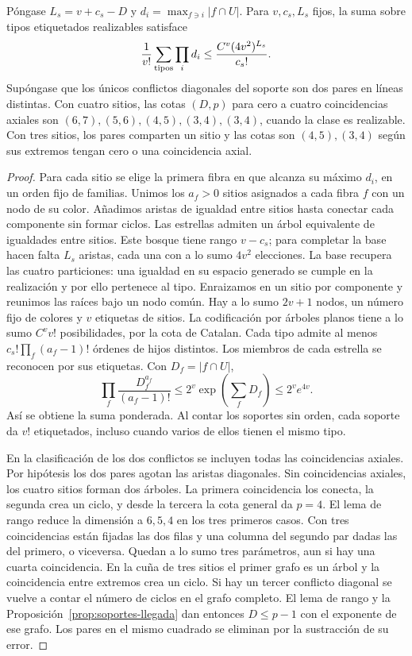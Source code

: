 \begin{lema}\label{lem:tipos-llegada}
Póngase \(L_s=v+c_s-D\) y \(d_i=\max_{f\ni i}|f\cap U|\). Para \(v,c_s,L_s\) fijos,
la suma sobre tipos etiquetados realizables satisface
\[
 \frac1{v!}\sum_{\rm tipos}\prod_i d_i\le \frac{C^v(4v^2)^{L_s}}{c_s!}.
\]
Supóngase que los únicos conflictos diagonales del soporte son dos pares en líneas distintas.
Con cuatro sitios, las cotas \((D,p)\) para cero a cuatro coincidencias axiales son
\((6,7),(5,6),(4,5),(3,4),(3,4)\), cuando la clase es realizable.
Con tres sitios, los pares comparten un sitio y las cotas son \((4,5),(3,4)\)
según sus extremos tengan cero o una coincidencia axial.
\end{lema}
\begin{proof}
Para cada sitio se elige la primera fibra en que alcanza su máximo \(d_i\), en un orden
fijo de familias. Unimos los \(a_f>0\) sitios asignados a cada fibra \(f\) con un nodo de
su color. Añadimos aristas de igualdad entre sitios hasta conectar cada componente sin
formar ciclos. Las estrellas admiten un árbol equivalente de igualdades entre sitios.
Este bosque tiene rango \(v-c_s\); para completar la base hacen falta \(L_s\) aristas,
cada una con a lo sumo \(4v^2\) elecciones. La base recupera las cuatro particiones:
una igualdad en su espacio generado se cumple en la realización y por ello pertenece al
tipo. Enraizamos en un sitio por componente y reunimos las raíces bajo un nodo común.
Hay a lo sumo \(2v+1\) nodos, un número fijo de colores y \(v\) etiquetas de sitios.
La codificación por árboles planos tiene a lo sumo \(C^v v!\) posibilidades, por la cota
de Catalan. Cada tipo admite al menos \(c_s!\prod_f(a_f-1)!\) órdenes de hijos distintos.
Los miembros de cada estrella se reconocen por sus etiquetas. Con \(D_f=|f\cap U|\),
\[
 \prod_f\frac{D_f^{a_f}}{(a_f-1)!}\le 2^v\exp\!\left(\sum_fD_f\right)
 \le 2^ve^{4v}.
\]
Así se obtiene la suma ponderada. Al contar los soportes sin orden, cada soporte da \(v!\)
etiquetados, incluso cuando varios de ellos tienen el mismo tipo.

En la clasificación de los dos conflictos se incluyen todas las coincidencias axiales.
Por hipótesis los dos pares agotan las aristas diagonales. Sin coincidencias axiales, los
cuatro sitios forman dos árboles. La primera
coincidencia los conecta, la segunda crea un ciclo, y desde la tercera la cota general da
\(p=4\). El lema de rango reduce la dimensión a \(6,5,4\) en los tres primeros casos.
Con tres coincidencias están fijadas las dos filas y una columna del segundo par dadas las del
primero, o viceversa. Quedan a lo sumo tres parámetros, aun si hay una cuarta coincidencia.
En la cuña de tres sitios el primer grafo es un árbol y la coincidencia entre extremos crea
un ciclo. Si hay un tercer conflicto diagonal se vuelve a contar el número de ciclos en el
grafo completo. El lema de rango y la Proposición~\ref{prop:soportes-llegada} dan entonces
\(D\le p-1\) con el exponente de ese grafo. Los pares en el mismo
cuadrado se eliminan por la sustracción de su error.
\end{proof}
